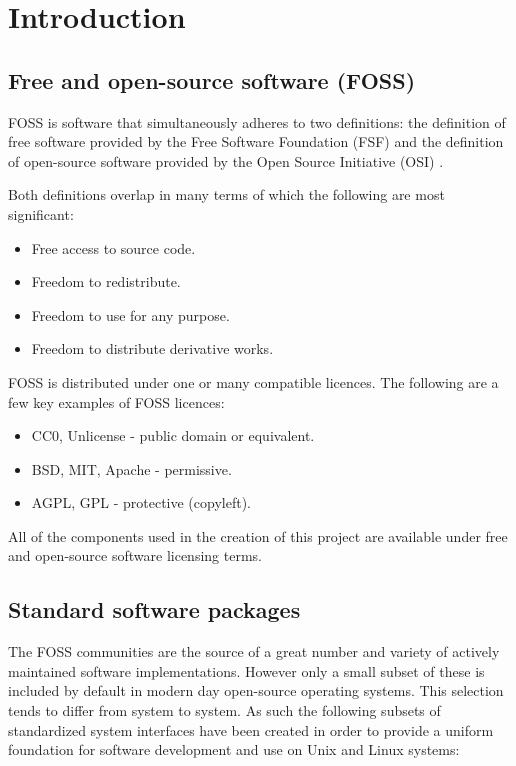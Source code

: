 \section{Introduction}\label{Introduction}

\subsection{Free and open-source software (FOSS)}

FOSS is software that simultaneously adheres to two definitions: the definition of free software provided by the Free Software Foundation (FSF) \cite{fsf} and the definition of open-source software provided by the Open Source Initiative (OSI) \cite{osi}.

Both definitions overlap in many terms of which the following are most significant:

\begin{itemize}
    \item Free access to source code.
    \item Freedom to redistribute.
    \item Freedom to use for any purpose.
    \item Freedom to distribute derivative works.
\end{itemize}

FOSS is distributed under one or many compatible licences. The following are a few key examples of FOSS licences:

\begin{itemize}
    \item CC0, Unlicense - public domain or equivalent.
    \item BSD, MIT, Apache - permissive.
    \item AGPL, GPL - protective (copyleft).
\end{itemize}

All of the components used in the creation of this project are available under free and open-source software licensing terms.

\subsection{Standard software packages}

The FOSS communities are the source of a great number and variety of actively maintained software implementations. However only a small subset of these is included by default in modern day open-source operating systems. This selection tends to differ from system to system. As such the following subsets of standardized system interfaces have been created in order to provide a uniform foundation for software development and use on Unix and Linux systems:

